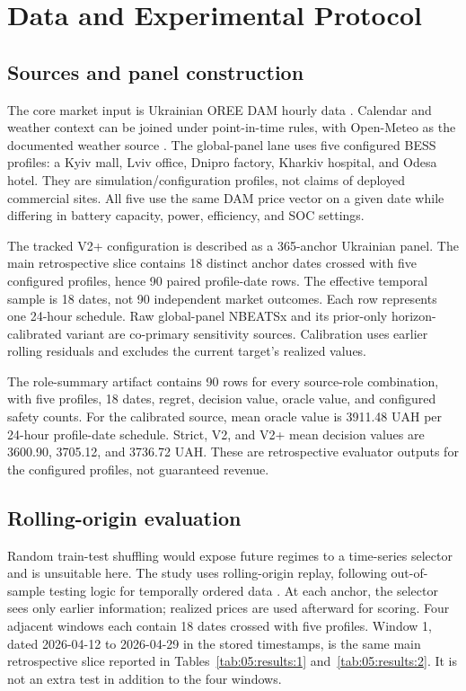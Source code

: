 \section{Data and Experimental Protocol}

\subsection{Sources and panel construction}

The core market input is Ukrainian OREE DAM hourly data \cite{oree2026dam}. Calendar and weather context can be joined under point-in-time rules, with Open-Meteo as the documented weather source \cite{openmeteo2026archive}. The global-panel lane uses five configured BESS profiles: a Kyiv mall, Lviv office, Dnipro factory, Kharkiv hospital, and Odesa hotel. They are simulation/configuration profiles, not claims of deployed commercial sites. All five use the same DAM price vector on a given date while differing in battery capacity, power, efficiency, and SOC settings.

The tracked V2+ configuration is described as a 365-anchor Ukrainian panel. The main retrospective slice contains 18 distinct anchor dates crossed with five configured profiles, hence 90 paired profile-date rows. The effective temporal sample is 18 dates, not 90 independent market outcomes. Each row represents one 24-hour schedule. Raw global-panel NBEATSx and its prior-only horizon-calibrated variant are co-primary sensitivity sources. Calibration uses earlier rolling residuals and excludes the current target's realized values.

The role-summary artifact contains 90 rows for every source-role combination, with five profiles, 18 dates, regret, decision value, oracle value, and configured safety counts. For the calibrated source, mean oracle value is 3911.48 UAH per 24-hour profile-date schedule. Strict, V2, and V2+ mean decision values are 3600.90, 3705.12, and 3736.72 UAH. These are retrospective evaluator outputs for the configured profiles, not guaranteed revenue.

\subsection{Rolling-origin evaluation}

Random train-test shuffling would expose future regimes to a time-series selector and is unsuitable here. The study uses rolling-origin replay, following out-of-sample testing logic for temporally ordered data \cite{tashman2000outofsample}. At each anchor, the selector sees only earlier information; realized prices are used afterward for scoring. Four adjacent windows each contain 18 dates crossed with five profiles. Window 1, dated 2026-04-12 to 2026-04-29 in the stored timestamps, is the same main retrospective slice reported in Tables~\ref{tab:05:results:1} and~\ref{tab:05:results:2}. It is not an extra test in addition to the four windows.

